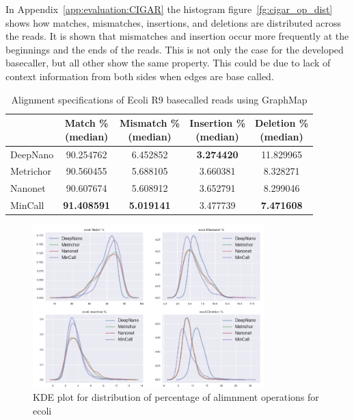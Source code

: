 \documentclass[runningheads,a4paper]{llncs}
\begin{document}
In Appendix~\ref{app:evaluation:CIGAR} the histogram figure~\ref{fg:cigar_op_dist} shows how matches, mismatches, insertions, and deletions are distributed across the reads. It is shown that mismatches and insertion occur more frequently at the beginnings and the ends of the reads. This is not only the case for the developed basecaller, but all other show the same property. This could be due to lack of context information from both sides when edges are base called.

\begin{table}[]
	\caption{Alignment specifications of Ecoli R9 basecalled reads using GraphMap}
	\label{tbl:ecoli_rates}
	\centering
	\begin{tabular}{lcccc}
		\toprule
		{} &  \thead{Match \% \\(median)} &  \thead{Mismatch \% \\(median)} &  \thead{Insertion \% \\(median)} &  \thead{Deletion \% \\(median)} \\
		\midrule
		DeepNano   &                  90.254762 &                      6.452852 &                       \textbf{3.274420} &                     11.829965 \\
		Metrichor  &                  90.560455 &                      5.688105 &                       3.660381 &                      8.328271 \\
		Nanonet    &                  90.607674 &                      5.608912 &                       3.652791 &                      8.299046 \\
		MinCall    &                  \textbf{91.408591} &                     \textbf{ 5.019141} &                       3.477739 &                      \textbf{7.471608 }\\
		\bottomrule
	\end{tabular}
\end{table}

\begin{figure}[]
	\begin{center}
		\includegraphics[width=0.8\textwidth]{./imgs/results/ecoli/kde_cigar.png}
		\caption{KDE plot for distribution of percentage of alimnment operations for ecoli}
		\label{fg:ecoli_kde}
	\end{center}
\end{figure}
\end{document}
